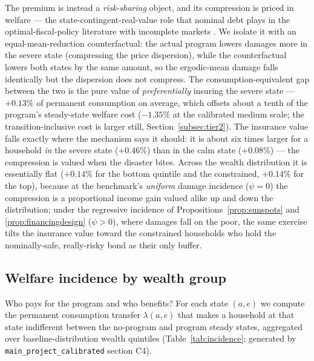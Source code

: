 \documentclass[12pt]{article}
\makeatletter
\newcommand{\FloatBarrier}{\par
    \begingroup\let\@elt\relax
    \edef\reserved@a{\@deferlist}\endgroup
    \ifx\reserved@a\@empty\else\clearpage\fi}
\makeatother
\begin{document}
The premium is instead a \emph{risk-sharing} object, and its compression is
priced in welfare --- the state-contingent-real-value role that nominal
debt plays in the optimal-fiscal-policy literature with incomplete markets
\citep{begs2017,begs2021}. We isolate it with an equal-mean-reduction
counterfactual: the actual program lowers damages more in the severe state
(compressing the price dispersion), while the counterfactual lowers both
states by the same amount, so the ergodic-mean damage falls identically but
the dispersion does not compress. The consumption-equivalent gap between the
two is the pure value of \emph{preferentially} insuring the severe state ---
$+0.13\%$ of permanent consumption on average, which offsets about a tenth of
the program's steady-state welfare cost ($-1.35\%$ at the calibrated medium
scale; the transition-inclusive cost is larger still,
Section~\ref{subsec:tier2}). The insurance value falls exactly where the
mechanism says it should: it is about six times larger for a household
\emph{in} the severe state ($+0.46\%$) than in the calm state ($+0.08\%$) ---
the compression is valued when the disaster bites. Across the wealth
distribution it is essentially flat ($+0.14\%$ for the bottom quintile and
the constrained, $+0.14\%$ for the top), because at the benchmark's
\emph{uniform} damage incidence ($\psi=0$) the compression is a proportional
income gain valued alike up and down the distribution; under the regressive
incidence of Propositions~\ref{prop:sunspots} and
\ref{prop:financingdesign} ($\psi>0$), where damages fall on the poor, the
same exercise tilts the insurance value toward the constrained households who
hold the nominally-safe, really-risky bond as their only buffer.


\FloatBarrier
\subsection{Welfare incidence by wealth group}
\label{subsec:welfaregroups}

Who pays for the program and who benefits? For each state $(a,e)$ we compute
the permanent consumption transfer $\lambda(a,e)$ that makes a household at
that state indifferent between the no-program and program steady states,
aggregated over baseline-distribution wealth quintiles
(Table~\ref{tab:incidence}; generated by \texttt{main\_project\_calibrated}
section C4).
\end{document}
